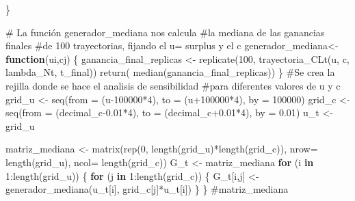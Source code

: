 \documentclass[
  us-letterpaper,
]{scrreprt}
\newenvironment{Shaded}{\begin{snugshade}}{\end{snugshade}}
\newcommand{\AttributeTok}[1]{\textcolor[rgb]{0.40,0.45,0.13}{#1}}
\newcommand{\CommentTok}[1]{\textcolor[rgb]{0.37,0.37,0.37}{#1}}
\newcommand{\ControlFlowTok}[1]{\textcolor[rgb]{0.00,0.23,0.31}{\textbf{#1}}}
\newcommand{\DecValTok}[1]{\textcolor[rgb]{0.68,0.00,0.00}{#1}}
\newcommand{\FloatTok}[1]{\textcolor[rgb]{0.68,0.00,0.00}{#1}}
\newcommand{\FunctionTok}[1]{\textcolor[rgb]{0.28,0.35,0.67}{#1}}
\newcommand{\NormalTok}[1]{\textcolor[rgb]{0.00,0.23,0.31}{#1}}
\newcommand{\OtherTok}[1]{\textcolor[rgb]{0.00,0.23,0.31}{#1}}
\newcommand{\SpecialCharTok}[1]{\textcolor[rgb]{0.37,0.37,0.37}{#1}}
\theoremstyle{plain}
\theoremstyle{plain}
\theoremstyle{definition}
\theoremstyle{remark}
\begin{document}
\begin{Shaded}
\begin{Highlighting}[]
\NormalTok{\}}

\CommentTok{\# La función generador\_mediana nos calcula }
\CommentTok{\#la mediana de las ganancias finales }
\CommentTok{\#de 100 trayectorias, fijando el u= surplus y el c}
\NormalTok{generador\_mediana}\OtherTok{\textless{}{-}} \ControlFlowTok{function}\NormalTok{(ui,cj)}
\NormalTok{  \{}
\NormalTok{  ganancia\_final\_replicas }\OtherTok{\textless{}{-}} \FunctionTok{replicate}\NormalTok{(}\DecValTok{100}\NormalTok{, }
                                       \FunctionTok{trayectoria\_CLt}\NormalTok{(u, c,}
\NormalTok{                                        lambda\_Nt, t\_final))}
  \FunctionTok{return}\NormalTok{( }\FunctionTok{median}\NormalTok{(ganancia\_final\_replicas))}
\NormalTok{  \}}
\CommentTok{\#Se crea la rejilla donde se hace el analisis de sensibilidad}
\CommentTok{\#para diferentes valores de u y c}
\NormalTok{grid\_u }\OtherTok{\textless{}{-}} \FunctionTok{seq}\NormalTok{(}\AttributeTok{from =}\NormalTok{ (u}\DecValTok{{-}100000}\SpecialCharTok{*}\DecValTok{4}\NormalTok{), }\AttributeTok{to =}\NormalTok{ (u}\SpecialCharTok{+}\DecValTok{100000}\SpecialCharTok{*}\DecValTok{4}\NormalTok{), }\AttributeTok{by =} \DecValTok{100000}\NormalTok{)}
\NormalTok{grid\_c }\OtherTok{\textless{}{-}} \FunctionTok{seq}\NormalTok{(}\AttributeTok{from =}\NormalTok{ (decimal\_c}\FloatTok{{-}0.01}\SpecialCharTok{*}\DecValTok{4}\NormalTok{), }\AttributeTok{to =}\NormalTok{ (decimal\_c}\FloatTok{+0.01}\SpecialCharTok{*}\DecValTok{4}\NormalTok{), }
              \AttributeTok{by =} \FloatTok{0.01}\NormalTok{)}
\NormalTok{u\_t }\OtherTok{\textless{}{-}}\NormalTok{ grid\_u}

\NormalTok{matriz\_mediana }\OtherTok{\textless{}{-}} \FunctionTok{matrix}\NormalTok{(}\FunctionTok{rep}\NormalTok{(}\DecValTok{0}\NormalTok{, }\FunctionTok{length}\NormalTok{(grid\_u)}\SpecialCharTok{*}\FunctionTok{length}\NormalTok{(grid\_c)),}
\AttributeTok{nrow=} \FunctionTok{length}\NormalTok{(grid\_u), }\AttributeTok{ncol=} \FunctionTok{length}\NormalTok{(grid\_c))}
\NormalTok{G\_t }\OtherTok{\textless{}{-}}\NormalTok{ matriz\_mediana}
\ControlFlowTok{for}\NormalTok{ (i }\ControlFlowTok{in} \DecValTok{1}\SpecialCharTok{:}\FunctionTok{length}\NormalTok{(grid\_u)) }
\NormalTok{  \{}
    \ControlFlowTok{for}\NormalTok{ (j }\ControlFlowTok{in} \DecValTok{1}\SpecialCharTok{:}\FunctionTok{length}\NormalTok{(grid\_c)) }
\NormalTok{      \{}
\NormalTok{        G\_t[i,j] }\OtherTok{\textless{}{-}} \FunctionTok{generador\_mediana}\NormalTok{(u\_t[i],}
\NormalTok{                              grid\_c[j]}\SpecialCharTok{*}\NormalTok{u\_t[i])}
\NormalTok{      \}}
\NormalTok{  \}  }
\CommentTok{\#matriz\_mediana}


\end{Highlighting}
\end{Shaded}
\end{document}
